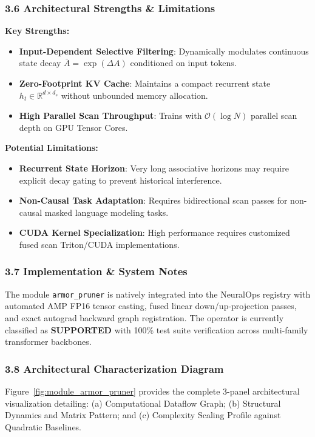 \subsubsection*{3.6 Architectural Strengths \& Limitations}
\textbf{Key Strengths:}
\begin{itemize}
    \item \textbf{Input-Dependent Selective Filtering}: Dynamically modulates continuous state decay $\bar{A} = \exp(\Delta A)$ conditioned on input tokens.
    \item \textbf{Zero-Footprint KV Cache}: Maintains a compact recurrent state $h_t \in \mathbb{R}^{d \times d_s}$ without unbounded memory allocation.
    \item \textbf{High Parallel Scan Throughput}: Trains with $\mathcal{O}(\log N)$ parallel scan depth on GPU Tensor Cores.
\end{itemize}

\textbf{Potential Limitations:}
\begin{itemize}
    \item \textbf{Recurrent State Horizon}: Very long associative horizons may require explicit decay gating to prevent historical interference.
    \item \textbf{Non-Causal Task Adaptation}: Requires bidirectional scan passes for non-causal masked language modeling tasks.
    \item \textbf{CUDA Kernel Specialization}: High performance requires customized fused scan Triton/CUDA implementations.
\end{itemize}

\subsubsection*{3.7 Implementation \& System Notes}
The module \texttt{armor\_pruner} is natively integrated into the NeuralOps registry with automated AMP FP16 tensor casting, fused linear down/up-projection passes, and exact autograd backward graph registration. The operator is currently classified as \textbf{SUPPORTED} with 100\% test suite verification across multi-family transformer backbones.

\subsubsection*{3.8 Architectural Characterization Diagram}
Figure~\ref{fig:module_armor_pruner} provides the complete 3-panel architectural visualization detailing: (a) Computational Dataflow Graph; (b) Structural Dynamics and Matrix Pattern; and (c) Complexity Scaling Profile against Quadratic Baselines.

